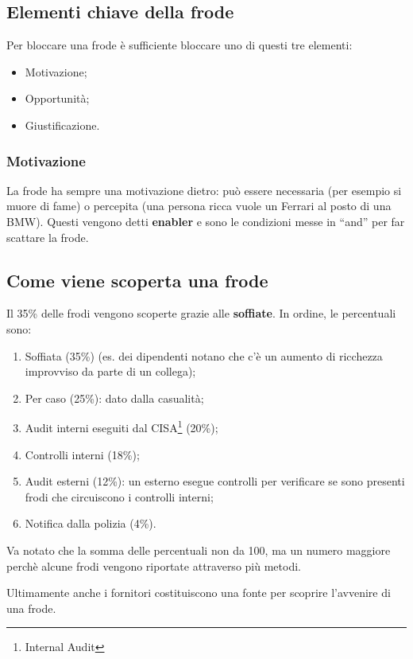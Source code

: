 \subsection{Elementi chiave della frode}

Per bloccare una frode è sufficiente bloccare uno di questi tre elementi:
\begin{itemize}
  \item Motivazione;
  \item Opportunità;
  \item Giustificazione.
\end{itemize}

\subsubsection{Motivazione}

La frode ha sempre una motivazione dietro: può essere necessaria (per esempio
si muore di fame) o percepita (una persona ricca vuole un Ferrari al posto di
una BMW). Questi vengono detti \textbf{enabler} e sono le condizioni messe in
``and'' per far scattare la frode.

\subsection{Come viene scoperta una frode}

Il 35\% delle frodi vengono scoperte grazie alle \textbf{soffiate}. In ordine,
le percentuali sono:
\begin{enumerate}
  \item Soffiata (35\%) (es. dei dipendenti notano che c'è un aumento di ricchezza 
  improvviso da parte di un collega);
  \item Per caso (25\%): dato dalla casualità;
  \item Audit interni eseguiti dal CISA\footnote{Internal Audit} (20\%);
  \item Controlli interni (18\%);
  \item Audit esterni (12\%): un esterno esegue controlli per verificare se 
  sono presenti frodi che circuiscono i controlli interni;
  \item Notifica dalla polizia (4\%).
\end{enumerate}
Va notato che la somma delle percentuali non da 100, ma un numero maggiore
perchè alcune frodi vengono riportate attraverso più metodi. 

Ultimamente anche i fornitori costituiscono una fonte per scoprire l'avvenire 
di una frode.

